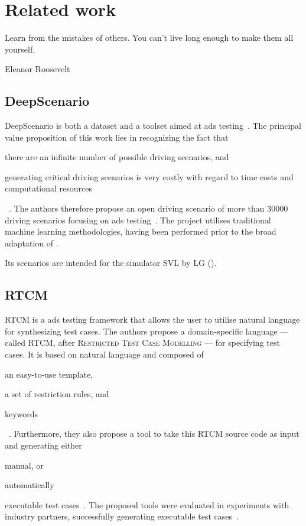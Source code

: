 \chapter{Related work}\label{sec:relatedWork}

\epigraph{Learn from the mistakes of others. You can't live long enough to make them all yourself.}{Eleanor Roosevelt}

\section{DeepScenario}\label{sec:deepScenario}

DeepScenario is both a dataset and a toolset aimed at \acrlong{ads} testing~\cite{DeepScenario}. The
principal value proposition of this work lies in recognizing the fact that \begin{inparaenum}
  \item there are an infinite number of possible driving scenarios, and
  \item generating critical driving scenarios is very costly with regard to time costs and
  computational resources\end{inparaenum}~\cite[52]{DeepScenario}. The authors therefore propose
an open driving scenario of more than \num{30000} driving scenarios focusing on \acrshort{ads}
testing~\cite[52]{DeepScenario}. The project utilises traditional machine learning
methodologies, having been performed prior to the broad adaptation of .

Its scenarios are intended for the simulator SVL by LG ().

\section{RTCM}

RTCM is a \acrshort{ads} testing framework that allows the user to utilise natural language for
synthesizing test cases. The authors propose a domain-specific language --- called RTCM, after
\textsc{Restricted Test Case Modelling} --- for specifying test cases. It is based on natural language
and composed of \begin{inparaenum}
  \item an easy-to-use template,
  \item a set of restriction rules, and
  \item keywords \end{inparaenum}~\cite[397]{RTCM}.  Furthermore, they also propose a tool to
take this RTCM source code as input and generating either \begin{inparaenum}
  \item manual, or
  \item automatically \end{inparaenum} executable test cases~\cite[397]{RTCM}. The proposed tools
were evaluated in experiments with industry partners, successfully generating executable test
cases~\cite[397]{RTCM}.

